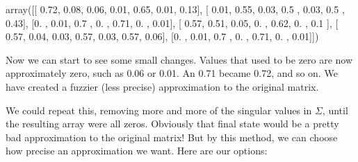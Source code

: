 \documentclass[letterpaper,10pt,english]{jupyterBook}
\begin{document}
\begin{sphinxVerbatim}[commandchars=\\\{\}]
\PYG{p}{[}\PYG{p}{]}  
     
   
       
\end{sphinxVerbatim}

\begin{sphinxVerbatim}[commandchars=\\\{\}]
array([[ 0.72,  0.08,  0.06,  0.01,  0.65,  0.01, \PYGZhy{}0.13],
       [ 0.01,  0.55,  0.03,  0.5 , \PYGZhy{}0.03,  0.5 ,  0.43],
       [\PYGZhy{}0.  , \PYGZhy{}0.01,  0.7 , \PYGZhy{}0.  ,  0.71, \PYGZhy{}0.  ,  0.01],
       [ 0.57,  0.51, \PYGZhy{}0.05, \PYGZhy{}0.  ,  0.62, \PYGZhy{}0.  ,  0.1 ],
       [ 0.57, \PYGZhy{}0.04, \PYGZhy{}0.03,  0.57,  0.03,  0.57,  0.06],
       [\PYGZhy{}0.  , \PYGZhy{}0.01,  0.7 , \PYGZhy{}0.  ,  0.71, \PYGZhy{}0.  ,  0.01]])
\end{sphinxVerbatim}

\sphinxAtStartPar
Now we can start to see some small changes.  Values that used to be zero are now approximately zero, such as 0.06 or \sphinxhyphen{}0.01.  An 0.71 became 0.72, and so on.  We have created a fuzzier (less precise) approximation to the original  matrix.

\sphinxAtStartPar
We could repeat this, removing more and more of the singular values in \(\Sigma\), until the resulting array were all zeros.  Obviously that final state would be a pretty bad approximation to the original matrix!  But by this method, we can choose how precise an approximation we want.  Here are our options:
\end{document}
